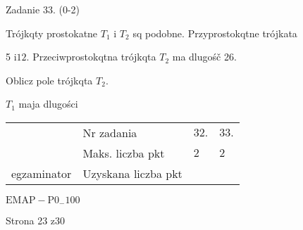 \documentclass[a4paper,12pt]{article}
\begin{document}
Zadanie 33. (0-2)

Trójkqty prostokatne $T_{1}$ i $T_{2}$ sq podobne. Przyprostokqtne trójkata

5 $\mathrm{i} 12$. Przeciwprostokqtna trójkqta $T_{2}$ ma dlugośč 26.

Oblicz pole trójkqta $T_{2}.$

$T_{1}$ maja dlugości
\begin{center}
\begin{tabular}{|l|l|l|l|}
\cline{2-4}
&	\multicolumn{1}{|l|}{Nr zadania}&	\multicolumn{1}{|l|}{$32.$}&	\multicolumn{1}{|l|}{ $33.$}	\\
\cline{2-4}
&	\multicolumn{1}{|l|}{Maks. liczba pkt}&	\multicolumn{1}{|l|}{$2$}&	\multicolumn{1}{|l|}{ $2$}	\\
\cline{2-4}
\multicolumn{1}{|l|}{egzaminator}&	\multicolumn{1}{|l|}{Uzyskana liczba pkt}&	\multicolumn{1}{|l|}{}&	\multicolumn{1}{|l|}{}	\\
\hline
\end{tabular}

\end{center}
$\mathrm{E}\mathrm{M}\mathrm{A}\mathrm{P}-\mathrm{P}0_{-}100$

Strona 23 z30
\end{document}
